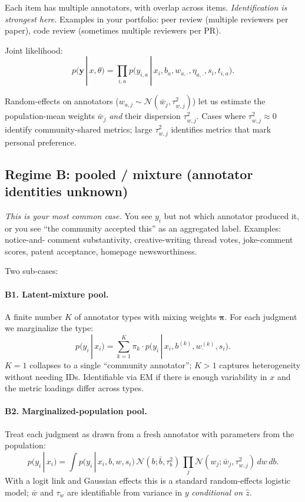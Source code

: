 \documentclass[11pt]{article}
\newcommand{\given}{\,|\,}
\begin{document}
Each item has multiple annotators, with overlap across items. \emph{Identification is
strongest here.} Examples in your portfolio: peer review (multiple reviewers per paper),
code review (sometimes multiple reviewers per PR).

Joint likelihood:
\[
p(\bm y \given x, \theta)
= \prod_{i,a} p\bigl(y_{i,a} \given x_i, b_a, w_{a,\cdot}, \eta_{a,\cdot}, s_i, t_{i,a}\bigr).
\]

Random-effects on annotators ($w_{a,j} \sim \mathcal{N}(\bar w_j, \tau_{w,j}^2)$) let us
estimate the population-mean weights $\bar w_j$ \emph{and} their dispersion $\tau_{w,j}^2$.
Cases where $\tau_{w,j}^2 \approx 0$ identify community-shared metrics; large
$\tau_{w,j}^2$ identifies metrics that mark personal preference.

\subsection{Regime B: pooled / mixture (annotator identities unknown)}

\emph{This is your most common case.} You see $y_i$ but not which annotator produced it,
or you see ``the community accepted this'' as an aggregated label. Examples: notice-and-
comment substantivity, creative-writing thread votes, joke-comment scores, patent
acceptance, homepage newsworthiness.

Two sub-cases:

\paragraph{B1. Latent-mixture pool.} A finite number $K$ of annotator types with mixing
weights $\bm\pi$. For each judgment we marginalize the type:
\[
p(y_i \given x_i)
= \sum_{k=1}^K \pi_k \cdot p\bigl(y_i \given x_i, b^{(k)}, w^{(k)}_{\cdot}, s_i\bigr).
\]
$K=1$ collapses to a single ``community annotator''; $K>1$ captures heterogeneity without
needing IDs. Identifiable via EM if there is enough variability in $x$ and the metric
loadings differ across types.

\paragraph{B2. Marginalized-population pool.} Treat each judgment as drawn from a fresh
annotator with parameters from the population:
\[
p(y_i \given x_i)
= \int p\bigl(y_i \given x_i, b, w, s_i\bigr)\,
        \mathcal{N}(b;\bar b,\tau_b^2)\,
        \prod_j \mathcal{N}(w_j;\bar w_j,\tau_{w,j}^2)
        \,dw\,db.
\]
With a logit link and Gaussian effects this is a standard random-effects logistic model;
$\bar w$ and $\tau_w$ are identifiable from variance in $y$ \emph{conditional on $\hat z$}.
\end{document}
